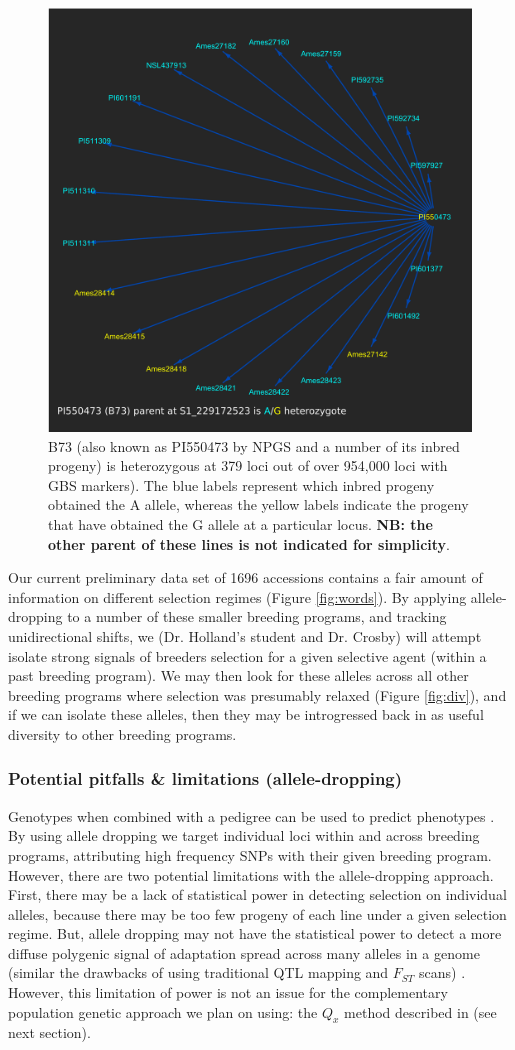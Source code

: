 \documentclass[12pt]{article}
\begin{document}
\begin{figure}
\includegraphics[width=0.5\linewidth]{Pruned.pdf}
\caption{B73 (also known as PI550473 by NPGS and a number of its inbred progeny) is heterozygous at 379 loci out of over 954,000 loci with GBS markers). The blue labels represent which inbred progeny obtained the A allele, whereas the yellow labels indicate the progeny that have obtained the G allele at a particular locus. \textbf{NB: the other parent of these lines is not indicated for simplicity}.}
\label{fig:alleledrop}
\end{figure}

Our current preliminary data set of 1696 accessions contains a fair amount of information on different selection regimes (Figure \ref{fig:words}). 
By applying allele-dropping to a number of these smaller breeding programs, and tracking unidirectional shifts, we (Dr. Holland's student and Dr. Crosby) will attempt isolate strong signals of breeders selection for a given selective agent (within a past breeding program). 
We may then look for these alleles across all other breeding programs where selection was presumably relaxed (Figure \ref{fig:div}), and if we can isolate these alleles, then they may be introgressed back in as useful diversity to other breeding programs.

\subsubsection*{Potential pitfalls \& limitations (allele-dropping)}
Genotypes when combined with a pedigree can be used to predict phenotypes \citep{de2009predicting,crossa2010prediction,Decker:2012kd}.
By using allele dropping we target individual loci within and across breeding programs, attributing high frequency SNPs with their given breeding program. 
However, there are two potential limitations with the allele-dropping approach. First, there may be a lack of statistical power in detecting selection on individual alleles, because there may be too few progeny of each line under a given selection regime. 
But, allele dropping may not have the statistical power to detect a more diffuse polygenic signal of adaptation spread across many alleles in a genome (similar the drawbacks of using traditional QTL mapping and $F_{ST}$ scans) \cite{Rockman:2011ej, Berg:2014bs}. 
However, this limitation of power is not an issue for the complementary population genetic approach we plan on using: the $Q_{x}$ method described in \cite{Berg:2014bs} (see next section). 
\end{document}
